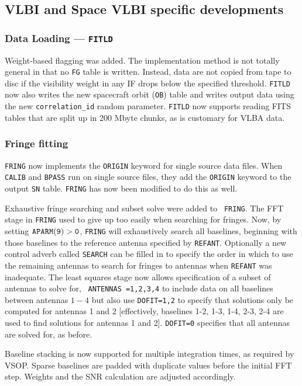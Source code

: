\subsection{VLBI and Space VLBI specific developments}


\subsubsection{Data Loading --- {\tt FITLD}}

Weight-based flagging was added. The implementation method is not
totally general in that no {\tt FG} table is written.  Instead, data
are not copied from tape to disc if the visibility weight in any IF
drops below the specified threshold.  {\tt FITLD} now also writes the
new spacecraft orbit ({\tt OB}) table and writes output data using the
new {\tt correlation\_id} random parameter.  {\tt FITLD} now supports
reading FITS tables that are split up in 200 Mbyte chunks, as is
customary for VLBA data.

\subsubsection{ Fringe fitting}

{\tt FRING} now implements the {\tt ORIGIN} keyword for single source
data files.  When {\tt CALIB} and {\tt BPASS} run on single source
files, they add the {\tt ORIGIN} keyword to the output {\tt SN} table.
{\tt FRING} has now been modified to do this as well.

Exhaustive fringe searching and subset solve were added to {\tt
FRING}.  The FFT stage in {\tt FRING} used to give up too easily when
searching for fringes.  Now, by setting $\tt APARM(9)>0$, {\tt FRING}
will exhaustively search all baselines, beginning with those baselines
to the reference antenna specified by {\tt REFANT}.  Optionally a new
control adverb called {\tt SEARCH} can be filled in to specify the
order in which to use the remaining antennas to search for fringes to
antennas when {\tt REFANT} was inadequate.  The least squares stage
now allows specification of a subset of antennas to solve for, \eg\
{\tt ANTENNAS =1,2,3,4} to include data on all baselines between
antennas $1-4$ but also use {\tt DOFIT=1,2} to specify that solutions
only be computed for antennas 1 and 2 [effectively, baselines 1-2,
1-3, 1-4, 2-3, 2-4 are used to find solutions for antennas 1 and 2].
{\tt DOFIT=0} specifies that all antennas are solved for, as before.

Baseline stacking is now supported for multiple integration times, as
required by VSOP.  Sparse baselines are padded with duplicate values
before the initial FFT step. Weights and the SNR calculation are
adjusted accordingly.


